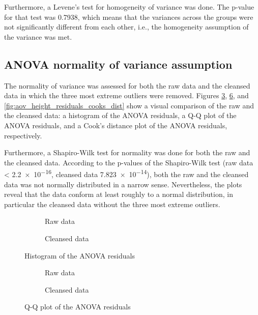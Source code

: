 Furthermore, a Levene's test for homogeneity of variance was done. The p-value for that test was \num{0.7938}, which means that the variances across the groups were not significantly different from each other, i.e., the homogeneity assumption of the variance was met.

\subsection{ANOVA normality of variance assumption}

The normality of variance was assessed for both the raw data and the cleansed data in which the three most extreme outliers were removed. Figures \ref{fig:aov_height_residuals_histogram}, \ref{fig:aov_height_residuals_qq}, and \ref{fig:aov_height_residuals_cooks_dist} show a visual comparison of the raw and the cleansed data: a histogram of the ANOVA residuals, a Q-Q plot of the ANOVA residuals, and a Cook's distance plot of the ANOVA residuals, respectively.

Furthermore, a Shapiro-Wilk test for normality was done for both the raw and the cleansed data. According to the p-values of the Shapiro-Wilk test (raw data < \num{2.2e-16}, cleansed data \num{7.823e-14}), both the raw and the cleansed data was not normally distributed in a narrow sense. Nevertheless, the plots reveal that the data conform at least roughly to a normal distribution, in particular the cleansed data without the three most extreme outliers.

\begin{figure}[htbp]
    \begin{subfigure}[t]{.48\textwidth}
        
        \caption{Raw data}
        \label{fig:raw_aov_height_residuals_histogram}
    \end{subfigure}
    \begin{subfigure}[t]{.48\textwidth}
        
        \caption{Cleansed data}
        \label{fig:clean_aov_height_residuals_histogram}
    \end{subfigure}
    \caption{Histogram of the ANOVA residuals}
    \label{fig:aov_height_residuals_histogram}
\end{figure}

\begin{figure}[htbp]
    \begin{subfigure}[t]{.48\textwidth}
        
        \caption{Raw data}
        \label{fig:raw_aov_height_residuals_qq}
    \end{subfigure}
    \begin{subfigure}[t]{.48\textwidth}
        
        \caption{Cleansed data}
        \label{fig:clean_aov_height_residuals_qq}
    \end{subfigure}
    \caption{Q-Q plot of the ANOVA residuals}
    \label{fig:aov_height_residuals_qq}
\end{figure}

